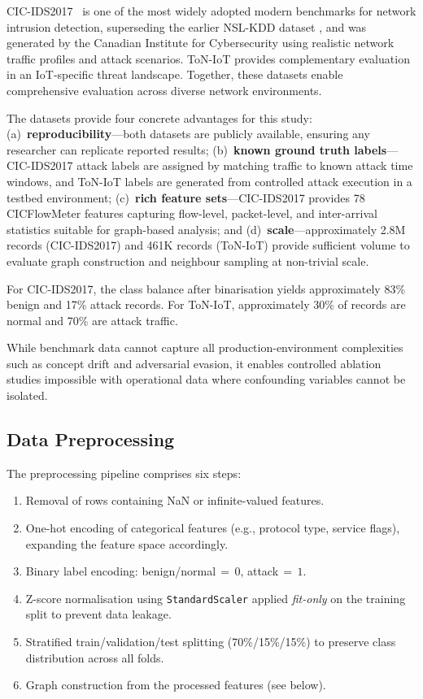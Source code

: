 \documentclass[conference]{IEEEtran}
\begin{document}
CIC-IDS2017~\cite{sharafaldin2018} is one of the most widely adopted modern
benchmarks for network intrusion detection, superseding the earlier NSL-KDD
dataset \cite{tavallaee2009}, and was generated by the Canadian Institute
for Cybersecurity using realistic network traffic profiles and attack scenarios.
ToN-IoT provides complementary evaluation in an IoT-specific threat landscape.
Together, these datasets enable comprehensive evaluation across diverse network
environments.

The datasets provide four concrete advantages for this study:
(a)~\textbf{reproducibility}---both datasets are publicly available, ensuring
any researcher can replicate reported results;
(b)~\textbf{known ground truth labels}---CIC-IDS2017 attack labels are assigned
by matching traffic to known attack time windows, and ToN-IoT labels are
generated from controlled attack execution in a testbed environment;
(c)~\textbf{rich feature sets}---CIC-IDS2017 provides 78 CICFlowMeter features
capturing flow-level, packet-level, and inter-arrival statistics suitable for
graph-based analysis; and (d)~\textbf{scale}---approximately 2.8M records
(CIC-IDS2017) and 461K records (ToN-IoT) provide sufficient volume to evaluate
graph construction and neighbour sampling at non-trivial scale.

For CIC-IDS2017, the class balance after binarisation yields approximately
83\% benign and 17\% attack records. For ToN-IoT, approximately 30\% of
records are normal and 70\% are attack traffic.

While benchmark data cannot capture all production-environment complexities
such as concept drift and adversarial evasion, it enables controlled
ablation studies impossible with operational data where confounding variables
cannot be isolated.

\subsection{Data Preprocessing}

The preprocessing pipeline comprises six steps:
\begin{enumerate}
    \item Removal of rows containing NaN or infinite-valued features.
    \item One-hot encoding of categorical features (e.g., protocol type,
    service flags), expanding the feature space accordingly.
    \item Binary label encoding: benign/normal$\,=\,0$, attack$\,=\,1$.
    \item Z-score normalisation using \texttt{StandardScaler} applied
    \textit{fit-only} on the training split to prevent data leakage.
    \item Stratified train/validation/test splitting (70\%/15\%/15\%) to
    preserve class distribution across all folds.
    \item Graph construction from the processed features (see below).
\end{enumerate}
\end{document}
